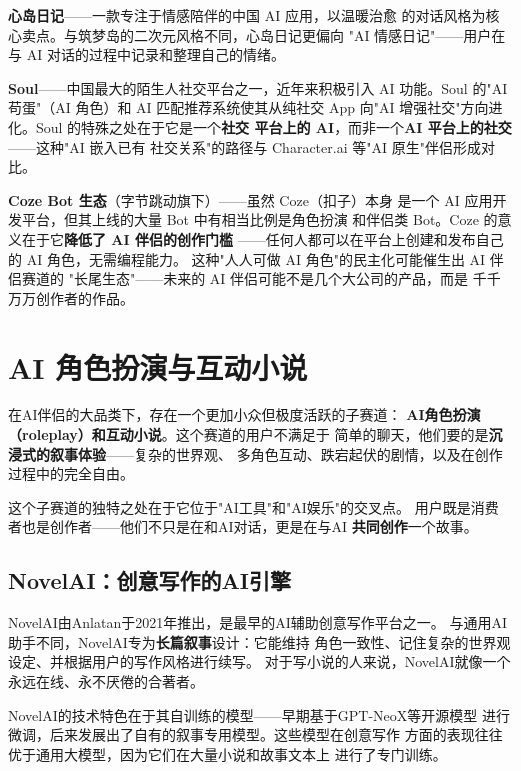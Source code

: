 \textbf{心岛日记}——一款专注于情感陪伴的中国 AI 应用，以温暖治愈
的对话风格为核心卖点。与筑梦岛的二次元风格不同，心岛日记更偏向
"AI 情感日记"——用户在与 AI 对话的过程中记录和整理自己的情绪。

\textbf{Soul}——中国最大的陌生人社交平台之一，近年来积极引入 AI
功能。Soul 的"AI 苟蛋"（AI 角色）和 AI 匹配推荐系统使其从纯社交
App 向"AI 增强社交"方向进化。Soul 的特殊之处在于它是一个\textbf{社交
平台上的 AI}，而非一个\textbf{AI 平台上的社交}——这种"AI 嵌入已有
社交关系"的路径与 Character.ai 等"AI 原生"伴侣形成对比。

\textbf{Coze Bot 生态}（字节跳动旗下）——虽然 Coze（扣子）本身
是一个 AI 应用开发平台，但其上线的大量 Bot 中有相当比例是角色扮演
和伴侣类 Bot。Coze 的意义在于它\textbf{降低了 AI 伴侣的创作门槛}
——任何人都可以在平台上创建和发布自己的 AI 角色，无需编程能力。
这种"人人可做 AI 角色"的民主化可能催生出 AI 伴侣赛道的
"长尾生态"——未来的 AI 伴侣可能不是几个大公司的产品，而是
千千万万创作者的作品。


\section{AI 角色扮演与互动小说}
\label{sec:social-roleplay}

在AI伴侣的大品类下，存在一个更加小众但极度活跃的子赛道：
\textbf{AI角色扮演（roleplay）和互动小说}。这个赛道的用户不满足于
简单的聊天，他们要的是\textbf{沉浸式的叙事体验}——复杂的世界观、
多角色互动、跌宕起伏的剧情，以及在创作过程中的完全自由。

这个子赛道的独特之处在于它位于"AI工具"和"AI娱乐"的交叉点。
用户既是消费者也是创作者——他们不只是在和AI对话，更是在与AI
\textbf{共同创作}一个故事。

\subsection{NovelAI：创意写作的AI引擎}
\label{subsec:novelai}

NovelAI由Anlatan于2021年推出，是最早的AI辅助创意写作平台之一。
与通用AI助手不同，NovelAI专为\textbf{长篇叙事}设计：它能维持
角色一致性、记住复杂的世界观设定、并根据用户的写作风格进行续写。
对于写小说的人来说，NovelAI就像一个永远在线、永不厌倦的合著者。

NovelAI的技术特色在于其自训练的模型——早期基于GPT-NeoX等开源模型
进行微调，后来发展出了自有的叙事专用模型。这些模型在创意写作
方面的表现往往优于通用大模型，因为它们在大量小说和故事文本上
进行了专门训练。

